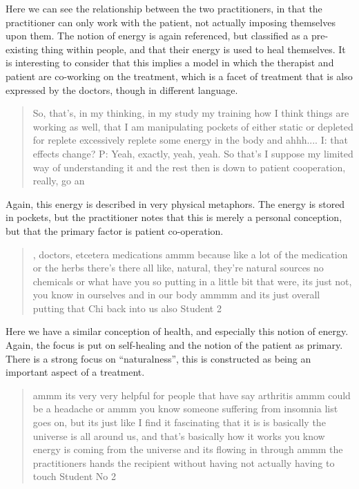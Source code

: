 Here we can see the relationship between the two practitioners, in that the practitioner can only work with the patient, not actually imposing themselves upon them. The notion of energy is again referenced, but classified as a pre-existing thing within people, and that their energy is used to heal themselves. It is interesting to consider that this implies a model in which the therapist and patient are co-working on the treatment, which is a facet of treatment that is also expressed by the doctors, though in different language. 

\begin{quotation}
  So, that's, in my thinking, in my study my training how I think things are working as well, that I am manipulating pockets of either static or depleted for replete excessively replete some energy in the body and ahhh....
I: that effects change?
P: Yeah, exactly, yeah, yeah. So that's I suppose my limited way of understanding it and the rest then is down to patient cooperation, really, go an

\end{quotation}

Again, this energy is described in very physical metaphors. The energy is stored in pockets, but the practitioner notes that this is merely a personal conception, but that the primary factor is patient co-operation. 



  
\begin{quotation}
  , doctors, etcetera medications ammm because like a lot of the medication or the herbs there's there all like, natural, they're natural sources no chemicals or what have you so putting in a little bit that were, its just not, you know in ourselves and in our body ammmm and its just overall putting that Chi back into us also
Student 2
\end{quotation}

Here we have a similar conception of health, and especially this notion  of energy. Again, the focus is put on self-healing and the notion of the patient as primary. There is a strong focus on ``naturalness'', this is constructed as being an important aspect of a treatment. 

\begin{quotation}
  ammm its very very helpful for people that have say arthritis ammm could be a headache or ammm you know someone suffering from insomnia list goes on, but its just like I find it fascinating that it is is basically the universe is all around us, and that's basically how it works you know energy is coming from the universe and its flowing in through ammm the practitioners hands the recipient without having not actually having to touch 
Student No 2
\end{quotation}


